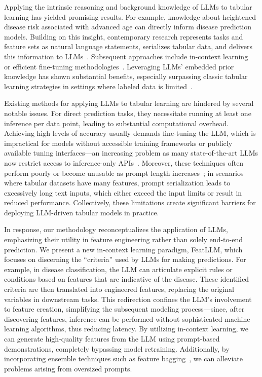 Applying the intrinsic reasoning and background knowledge of LLMs to tabular learning has yielded promising results. For example, knowledge about heightened disease risk associated with advanced age can directly inform disease prediction models. Building on this insight, contemporary research represents tasks and feature sets as natural language statements, serializes tabular data, and delivers this information to LLMs~\cite{dinh2022lift,wang2023anypredict}. Subsequent approaches include in-context learning~\cite{nam2023semi} or efficient fine-tuning methodologies~\cite{dinh2022lift,hegselmann2023tabllm}. Leveraging LLMs' embedded prior knowledge has shown substantial benefits, especially surpassing classic tabular learning strategies in settings where labeled data is limited~\cite{hegselmann2023tabllm}.

Existing methods for applying LLMs to tabular learning are hindered by several notable issues. For direct prediction tasks, they necessitate running at least one inference per data point, leading to substantial computational overhead. Achieving high levels of accuracy usually demands fine-tuning the LLM, which is impractical for models without accessible training frameworks or publicly available tuning interfaces—an increasing problem as many state-of-the-art LLMs now restrict access to inference-only APIs~\cite{anil2023palm,openai2023gpt4}. Moreover, these techniques often perform poorly or become unusable as prompt length increases~\cite{liu2023lost}; in scenarios where tabular datasets have many features, prompt serialization leads to excessively long text inputs, which either exceed the input limits or result in reduced performance. Collectively, these limitations create significant barriers for deploying LLM-driven tabular models in practice.

In response, our methodology reconceptualizes the application of LLMs, emphasizing their utility in feature engineering rather than solely end-to-end prediction. We present a new in-context learning paradigm, \textsf{FeatLLM}, which focuses on discerning the “criteria” used by LLMs for making predictions. For example, in disease classification, the LLM can articulate explicit rules or conditions based on features that are indicative of the disease. These identified criteria are then translated into engineered features, replacing the original variables in downstream tasks. This redirection confines the LLM’s involvement to feature creation, simplifying the subsequent modeling process—since, after discovering features, inference can be performed without sophisticated machine learning algorithms, thus reducing latency. By utilizing in-context learning, we can generate high-quality features from the LLM using prompt-based demonstrations, completely bypassing model retraining. Additionally, by incorporating ensemble techniques such as feature bagging~\cite{breiman2001random}, we can alleviate problems arising from oversized prompts.

